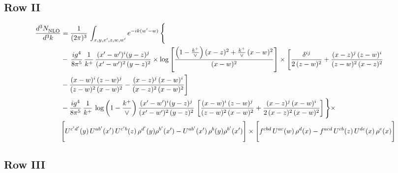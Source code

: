 \documentclass[9pt]{article}
\numberwithin{equation}{section}
\begin{document}
\subsection{Row II}
\begin{align}
     \frac{d^{3}N_{\rm NLO}^{\rm}}{d^{3}k}  & =   \frac{1}{(2\pi)^{3}}\, \int_{x,y,x',z,w,w^{\prime}} e^{-ik(w^{\prime}-w)}\, \Bigg\{\notag \\
& -\,\frac{ig^{4}}{8\pi^{5}}\,\frac{1}{k^{+}}\,\frac{(x'-w')^{i}(y-z)^{j}}{(x'-w')^{2}\,(y-z)^{2}}\times \log{\left[\frac{\left(1-\frac{k^{+}}{\vee}\right)(x-z)^{2}+\frac{k^{+}}{\vee}\,(x-w)^{2}}{(x-w)^{2}}\right]}\times \Bigg[\frac{\delta^{ij}}{2\,(z-w)^{2}}+\frac{(x-z)^{j}\,(z-w)^{i}}{(z-w)^{2}\,(x-z)^{2}}\notag \\ & -\frac{(x-w)^{i}\,(z-w)^{j}}{(z-w)^{2}\,(x-w)^{2}}-\frac{(x-z)^{j}\,(x-w)^{i}}{(x-z)^{2}\,(x-w)^{2}}\Bigg] \notag \\
& -\frac{ig^{4}}{8\pi^{5}}\,\frac{1}{k^{+}}\,\log{\left(1-\frac{k^{+}}{\vee}\right)}\,\frac{(x'-w')^{i}(y-z)^{j}}{(x'-w')^{2}\,(y-z)^{2}}\,\left[\frac{(x-w)^{i}\,(z-w)^{j}}{(z-w)^{2}\,(x-w)^{2}}+\frac{(x-z)^{j}\,(x-w)^{i}}{2\,(x-z)^{2}\, (x-w)^{2}}\right]\Bigg\}\times \notag \\ & \Bigg[U^{c'd'}(y)\,U^{ab'}(x')\,U^{c'b}(z)\,\rho^{d'}(y)\rho^{b'}(x')-U^{ab'}(x')\,\rho^{b}(y)\rho^{b'}(x')\Bigg]\times\Bigg[f^{cbd}\,U^{ac}(w)\,\rho^{d}(x)-f^{acd}\, U^{cb}(z)\,U^{de}(x)\,\rho^{e}(x)\Bigg]
\end{align}
 \subsection{Row III}
\end{document}
